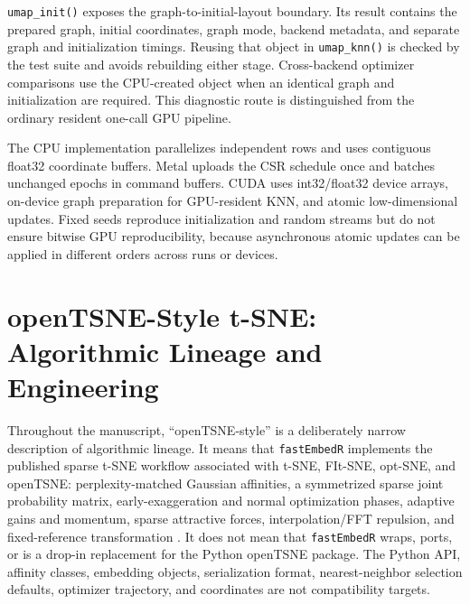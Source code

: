 \documentclass[twoside,11pt]{article}
\newcommand{\pkg}{\texttt{fastEmbedR}}
\begin{document}
\texttt{umap\_init()} exposes the graph-to-initial-layout boundary. Its result
contains the prepared graph, initial coordinates, graph mode, backend metadata,
and separate graph and initialization timings. Reusing that object in
\texttt{umap\_knn()} is checked by the test suite and avoids rebuilding either
stage. Cross-backend optimizer comparisons use the CPU-created object when an
identical graph and initialization are required. This diagnostic route is
distinguished from the ordinary resident one-call GPU pipeline.

The CPU implementation parallelizes independent rows and uses contiguous float32 coordinate buffers. Metal uploads the CSR schedule once and batches unchanged epochs in command buffers. CUDA uses int32/float32 device arrays, on-device graph preparation for GPU-resident KNN, and atomic low-dimensional updates. Fixed seeds reproduce initialization and random streams but do not ensure bitwise GPU reproducibility, because asynchronous atomic updates can be applied in different orders across runs or devices.

\section{openTSNE-Style t-SNE: Algorithmic Lineage and Engineering}

Throughout the manuscript, ``openTSNE-style'' is a deliberately narrow
description of algorithmic lineage. It means that \pkg{} implements the
published sparse t-SNE workflow associated with t-SNE, FIt-SNE, opt-SNE, and
openTSNE: perplexity-matched Gaussian affinities, a symmetrized sparse joint
probability matrix, early-exaggeration and normal optimization phases,
adaptive gains and momentum, sparse attractive forces, interpolation/FFT
repulsion, and fixed-reference transformation
\citep{vandermaaten2008,linderman2019,belkina2019,policar2021,policar2024}.
It does not mean that \pkg{} wraps, ports, or is a drop-in replacement for the
Python openTSNE package. The Python API, affinity classes, embedding objects,
serialization format, nearest-neighbor selection defaults, optimizer trajectory, and
coordinates are not compatibility targets.
\end{document}

